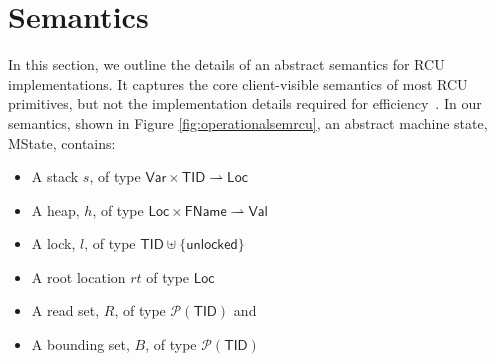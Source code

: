 \section{Semantics}
\label{sec:semantics}
In this section, we outline the details of an abstract semantics for RCU implementations. It captures the core client-visible semantics of most RCU primitives, but not the implementation details required for efficiency~\cite{Mckenney01read-copyupdate}.
In our semantics, shown in Figure \ref{fig:operationalsemrcu}, an abstract machine state, \textsf{MState}, contains:\\

\begin{itemize}
\item A stack $s$, of type $\textsf{Var} \times \textsf{TID} \rightharpoonup \textsf{Loc}$
\item A heap, $h$, of type $\textsf{Loc} \times \textsf{FName} \rightharpoonup \textsf{Val}$
\item A lock, $l$, of type $\textsf{TID} \uplus \{\textsf{unlocked}\}$
\item A root location $rt$ of type $\textsf{Loc}$
\item A read set, $R$, of type $\mathcal{P}(\textsf{TID})$ and 
\item A bounding set, $B$, of type $\mathcal{P}(\textsf{TID})$ 
\end{itemize}

